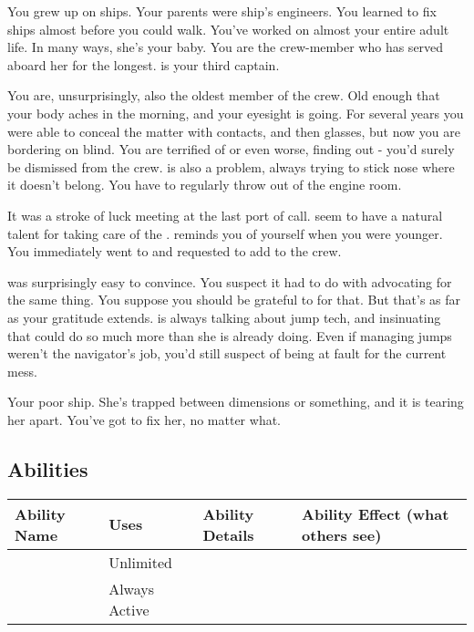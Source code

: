 \documentclass[char]{TMFHope}
\begin{document}
\name{\cEng{}}

You grew up on ships. Your parents were ship's engineers. You learned to fix ships almost before you could walk. You've worked on \pNew{} almost your entire adult life. In many ways, she's your baby. You are the crew-member who has served aboard her for the longest. \cCap{} is your third captain.

You are, unsurprisingly, also the oldest member of the crew. Old enough that your body aches in the morning, and your eyesight is going. For several years you were able to conceal the matter with contacts, and then glasses, but now you are bordering on blind. You are terrified of \cCap{} or even worse, \cXO{} finding out - you'd surely be dismissed from the crew. \cWeap{} is also a problem, always trying to stick \cWeap{\their} nose where it doesn't belong. You have to regularly throw \cWeap{\them} out of the engine room.

It was a stroke of luck meeting \cBoy{} at the last port of call. \cBoy{\They} seem\cBoy{\plural} to have a natural talent for taking care of the \pNew{}. \cBoy{} reminds you of yourself when you were younger. You immediately went to \cCap{} and requested to add \cBoy{} to the crew.

\cCap{} was surprisingly easy to convince. You suspect it had to do with \cNav{} advocating for the same thing. You suppose you should be grateful to \cNav{\them} for that. But that's as far as your gratitude extends. \cNav{} is always talking about jump tech, and insinuating that \pNew{} could do so much more than she is already doing. Even if managing jumps weren't the navigator's job, you'd still suspect \cNav{} of being at fault for the current mess.

Your poor ship. She's trapped between dimensions or something, and it is tearing her apart. You've got to fix her, no matter what.

\subsection*{Abilities}
\begin{tabular}{|p{3cm}|p{1.5cm}|p{8.5cm}|p{3cm}|} 
 \hline
 \textbf{Ability Name} & \textbf{Uses} & \textbf{Ability Details} & \textbf{Ability Effect (what others see)} \\ 
\hline 
 \aEngineering{\MYname} & Unlimited & \aEngineering{\MYtext} & \aEngineering{\MYeffect} \\ 
\hline
 \aEyesight{\MYname} & Always Active & \aEyesight{\MYtext} & \aEyesight{\MYeffect}\\ 
 \hline
\end{tabular}
\end{document}
